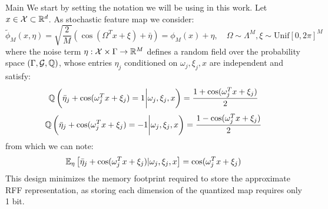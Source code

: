 \begin{chapter}{Main}
 We start by setting the notation we will be using in this work.
 Let $x \in \mathcal{X} \subset \mathbb{R}^d $. As stochastic feature map we consider:
 $$
     \tilde{\phi}_M(x, \eta) = \sqrt{\frac{2}{M}}(\cos(\Omega^T x + \xi) + \bar{\eta}) = \phi_M(x) + \eta, \quad \Omega \sim \Lambda^M, \xi \sim \text{Unif}[0, 2\pi]^M
 $$
 where the noise term $\eta: \mathcal{X} \times \Gamma \to \mathbb{R}^M$ defines a random field over the probability space $(\Gamma, \mathcal{G}, \mathbb{Q})$, whose entries $\eta_j$ conditioned on $\omega_j, \xi_j, x$ are independent and satisfy:
 $$
     \mathbb{Q}\left(\bar{\eta}_j + \cos(\omega_j^T x + \xi_j) = 1\bigg| \omega_j, \xi_j, x \right) = \frac{1+\cos(\omega_j^T x + \xi_j)}{2}
 $$
 $$
     \mathbb{Q}\left(\bar{\eta}_j + \cos(\omega_j^T x + \xi_j) = -1\bigg| \omega_j, \xi_j, x \right) = \frac{1-\cos(\omega_j^T x + \xi_j)}{2}
 $$
 from which we can note:
 $$
     \mathbb{E}_{\eta}\left[\bar{\eta}_j + \cos(\omega_j^T x + \xi_j)|\omega_j, \xi_j, x\right] = \cos(\omega^T_j x+\xi_j)
 $$
 This design minimizes the memory footprint required to store the approximate RFF representation, as storing each dimension of the quantized map requires only 1 bit. \\


\end{chapter}
